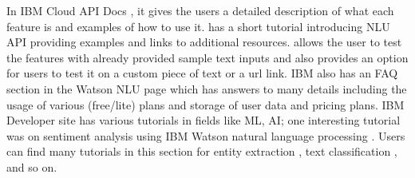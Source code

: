 \begin{itemize}
    In IBM Cloud API Docs \cite{watsonnlu}, it gives the users a detailed description of what each feature is and examples of how to use it. \cite{ibmstarter} has a short tutorial introducing \acs{NLU} \acs{API} providing examples and links to additional resources. \cite{ibmdemo} allows the user to test the features with already provided sample text inputs and also provides an option for users to test it on a custom piece of text or a \acs{url} link. IBM also has an \acs{FAQ} section \cite{ibmfaq} in the Watson \acs{NLU} page which has answers to many details including the usage of various (free/lite) plans and storage of user data and pricing plans. IBM Developer site has various tutorials in fields like \acl{ML}, \acl{AI}; one interesting tutorial was on sentiment analysis using IBM Watson natural language processing \cite{ibmref1}. Users can find many tutorials in this section for entity extraction \cite{ibmee}, text classification \cite{ibmtc}, and so on.
    

\end{itemize}
